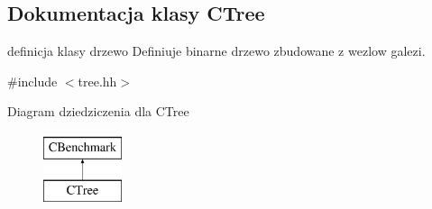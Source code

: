 \hypertarget{class_c_tree}{}\subsection{Dokumentacja klasy C\+Tree}
\label{class_c_tree}


definicja klasy drzewo Definiuje binarne drzewo zbudowane z wezlow galezi.  




{\ttfamily \#include $<$tree.\+hh$>$}

Diagram dziedziczenia dla C\+Tree\begin{figure}[H]
\begin{center}
\leavevmode
\includegraphics[height=2.000000cm]{class_c_tree}
\end{center}
\end{figure}
